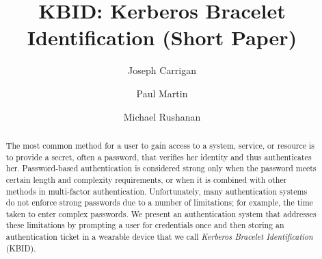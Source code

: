 \documentclass[runningheads,a4paper]{llncs}
\begin{document}
%

\title{KBID: Kerberos Bracelet Identification (Short Paper)}

\author{Joseph Carrigan \and Paul Martin \and Michael Rushanan}

%

			
\maketitle

\begin{abstract}
The most common method for a user to gain access to a system, service, or resource is to provide a secret, often a password, that verifies her identity and thus authenticates her. Password-based authentication is considered strong only when the password meets certain length and complexity requirements, or when it is combined with other methods in multi-factor authentication. Unfortunately, many authentication systems do not enforce strong passwords due to a number of limitations; for example, the time taken to enter complex passwords. We present an authentication system that addresses these limitations by prompting a user for credentials once and then storing an authentication ticket in a wearable device that we call \textit{Kerberos Bracelet Identification} (KBID).  
\end{abstract}


\end{document}
